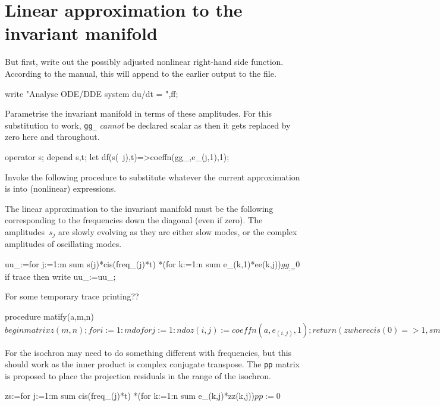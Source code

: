 \documentclass[11pt,a5paper]{article}
\begin{document}
\section{Linear approximation to the invariant manifold}

But first, write out the possibly adjusted nonlinear right-hand side function.
According to the manual, this will append to the earlier output to the file.
\begin{reduce}
write "Analyse ODE/DDE system du/dt = ",ff;
\end{reduce}

Parametrise the invariant manifold in terms of these amplitudes.
For this substitution to work, \verb|gg_| \emph{cannot} be declared scalar as then it gets replaced by zero here and throughout.
\begin{reduce}
operator s; depend s,t;
let df(s(~j),t)=>coeffn(gg_,e_(j,1),1);
\end{reduce}


Invoke the following procedure to substitute whatever the current approximation is into (nonlinear) expressions.


The linear approximation to the invariant manifold must be the following corresponding to the frequencies down the diagonal (even if zero).
The amplitudes~$s_j$ are slowly evolving as they are either slow modes, or the complex amplitudes of oscillating modes.
\begin{reduce}
uu_:=for j:=1:m sum s(j)*cis(freq_(j)*t)
  *(for k:=1:n sum e_(k,1)*ee(k,j))$
gg_:=0$
if trace then write uu_:=uu_;
\end{reduce}

For some temporary trace printing??
\begin{reduce}
procedure matify(a,m,n)$
  begin matrix z(m,n);
    for i:=1:m do for j:=1:n do z(i,j):=coeffn(a,e_(i,j),1);
    return (z where {cis(0)=>1,small=>s}); 
    end$
\end{reduce}

For the isochron may need to do something different with frequencies, but this should work as the inner product is complex conjugate transpose.
The \verb|pp| matrix is proposed to place the projection residuals in the range of the isochron. 
\begin{reduce}
zs:=for j:=1:m sum cis(freq_(j)*t)
  *(for k:=1:n sum e_(k,j)*zz(k,j))$
pp:=0$
\end{reduce}
\end{document}
